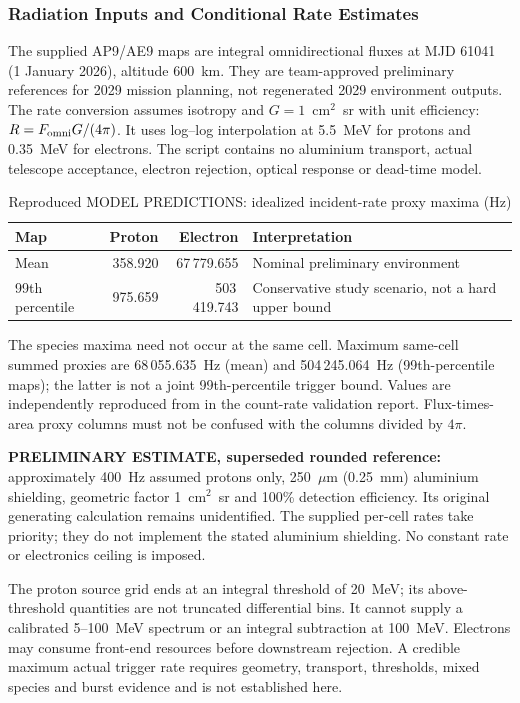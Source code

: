 \subsubsection{Radiation Inputs and Conditional Rate Estimates}\label{app:payload-data}
The supplied AP9/AE9 maps are integral omnidirectional fluxes at MJD 61041 (1 January 2026), altitude 600~km. They are team-approved preliminary references for 2029 mission planning, not regenerated 2029 environment outputs. The rate conversion assumes isotropy and $G=1$~cm$^2$~sr with unit efficiency: $R=F_{\rm omni}G/(4\pi)$. It uses log--log interpolation at 5.5~MeV for protons and 0.35~MeV for electrons. The script contains no aluminium transport, actual telescope acceptance, electron rejection, optical response or dead-time model.

\begin{table}[H]\centering\small
\caption{Reproduced MODEL PREDICTIONS: idealized incident-rate proxy maxima (Hz)}\label{tab:fpdu-rates}
\begin{tabularx}{\linewidth}{@{}lrrX@{}}\toprule
Map & Proton & Electron & Interpretation\\\midrule
Mean & 358.920 & 67\,779.655 & Nominal preliminary environment\\
99th percentile & 975.659 & 503\,419.743 & Conservative study scenario, not a hard upper bound\\\bottomrule
\end{tabularx}\end{table}
The species maxima need not occur at the same cell. Maximum same-cell summed proxies are 68\,055.635~Hz (mean) and 504\,245.064~Hz (99th-percentile maps); the latter is not a joint 99th-percentile trigger bound. Values are independently reproduced from  in the count-rate validation report. Flux-times-area proxy columns must not be confused with the columns divided by $4\pi$.

\textbf{PRELIMINARY ESTIMATE, superseded rounded reference:} approximately 400~Hz assumed protons only, 250~$\mu$m (0.25~mm) aluminium shielding, geometric factor 1~cm$^2$~sr and 100\% detection efficiency. Its original generating calculation remains unidentified. The supplied per-cell rates take priority; they do not implement the stated aluminium shielding. No constant rate or electronics ceiling is imposed.

The proton source grid ends at an integral threshold of 20~MeV; its above-threshold quantities are not truncated differential bins. It cannot supply a calibrated 5--100~MeV spectrum or an integral subtraction at 100~MeV. Electrons may consume front-end resources before downstream rejection. A credible maximum actual trigger rate requires geometry, transport, thresholds, mixed species and burst evidence and is not established here.

